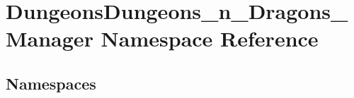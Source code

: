 \hypertarget{namespace_dungeons_dungeons__n___dragons___manager}{}\section{Dungeons\+Dungeons\+\_\+n\+\_\+\+Dragons\+\_\+\+Manager Namespace Reference}
\label{namespace_dungeons_dungeons__n___dragons___manager}
\subsection*{Namespaces}
\begin{DoxyCompactItemize}
\end{DoxyCompactItemize}
